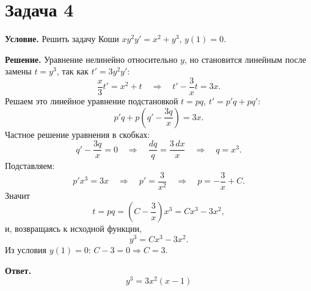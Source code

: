 \documentclass[12pt]{article}
\begin{document}
	\section*{Задача 4}

	\noindent
	\textbf{Условие.} Решить задачу Коши $xy^2y' = x^2 + y^3$, $y(1) = 0$.

	\noindent
	\textbf{Решение.} Уравнение нелинейно относительно $y$, но становится линейным после замены $t = y^3$, так как $t' = 3y^2y'$:
	\[
		\frac{x}{3}t' = x^2 + t \quad \Longrightarrow \quad t' - \frac{3}{x}t = 3x.
	\]
	Решаем это линейное уравнение подстановкой $t = pq$, $t' = p'q + pq'$:
	\[
		p'q + p\left( q' - \frac{3q}{x} \right) = 3x.
	\]
	Частное решение уравнения в скобках:
	\[
		q' - \frac{3q}{x} = 0 \quad \Longrightarrow \quad \frac{dq}{q} = \frac{3\,dx}{x} \quad \Longrightarrow \quad q = x^3.
	\]
	Подставляем:
	\[
		p'x^3 = 3x \quad \Longrightarrow \quad p' = \frac{3}{x^2} \quad \Longrightarrow \quad p = -\frac{3}{x} + C.
	\]
	Значит
	\[
		t = pq = \left( C - \frac{3}{x} \right)x^3 = Cx^3 - 3x^2,
	\]
	и, возвращаясь к исходной функции,
	\[
		y^3 = Cx^3 - 3x^2.
	\]
	Из условия $y(1) = 0$: $C - 3 = 0 \Rightarrow C = 3$.

	\medskip
	\noindent
	\textbf{Ответ.}
	\[
		\boxed{y^3 = 3x^2(x-1)}
	\]



\end{document}
